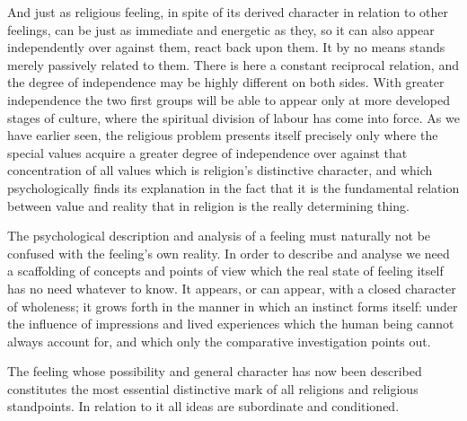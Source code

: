 \documentclass[12pt,a4paper]{book}
\newcommand{\opage}[1]{\marginnote{\footnotesize\textit{[#1]}}}
\begin{document}
And just as religious feeling, in spite of its derived character in relation to
other feelings, can be just as immediate and energetic as they, so it can also
appear independently over against them, react back upon them. It by no means
stands merely passively related to them. There is here a constant reciprocal
relation, and the degree of independence may be highly different on both sides.
With greater independence the two first groups will be able to appear only at
more developed stages of culture, where the spiritual division of labour has
come into force. As we have earlier seen, the religious 
\opage{64}problem presents itself
precisely only where the special values acquire a greater degree of
independence over against that concentration of all values which is religion's
distinctive character, and which psychologically finds its explanation in the
fact that it is the fundamental relation between value and reality that in
religion is the really determining thing.

The psychological description and analysis of a feeling must naturally not be
confused with the feeling's own reality. In order to describe and analyse we
need a scaffolding of concepts and points of view which the real state of
feeling itself has no need whatever to know. It appears, or can appear, with a
closed character of wholeness; it grows forth in the manner in which an
instinct forms itself: under the influence of impressions and lived experiences
which the human being cannot always account for, and which only the comparative
investigation points out.

The feeling whose possibility and general character has now been described
constitutes the most essential distinctive mark of all religions and religious
standpoints. In relation to it all ideas are subordinate and conditioned.
\end{document}
